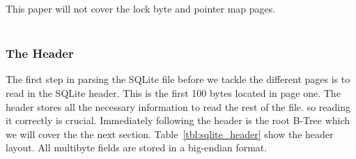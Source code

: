 This paper will not cover the lock byte and pointer map pages. 
\\\\
\subsubsection{The Header}
\label{subsubsec:sqlite_page_hader}

The first step in parsing the SQLite file before we tackle the different pages is to read in the SQLite header. This is the first 100 bytes located in page one. The header stores all the necessary information to read the rest of the file. so reading it correctly is crucial. Immediately following the header is the root B-Tree which we will cover the the next section. Table~\ref{tbl:sqlite_header} show the header layout.  All multibyte fields are stored in a big-endian format.

